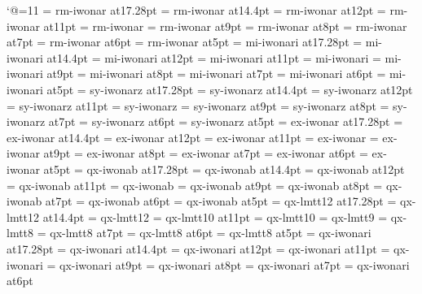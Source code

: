 \catcode`@=11
\font\seventeenrm=  rm-iwonar at17.28pt
\font\fourteenrm=   rm-iwonar at14.4pt
\font\twelverm=     rm-iwonar at12pt
\font\elevenrm=     rm-iwonar at11pt
\font\tenrm=        rm-iwonar
\font\ninerm=       rm-iwonar at9pt
\font\eightrm=      rm-iwonar at8pt
\font\sevenrm=      rm-iwonar at7pt
\font\sixrm=        rm-iwonar at6pt
\font\fiverm=       rm-iwonar at5pt
\font\seventeeni=   mi-iwonari at17.28pt
\font\fourteeni=    mi-iwonari at14.4pt
\font\twelvei=      mi-iwonari at12pt
\font\eleveni=      mi-iwonari at11pt
\font\teni=         mi-iwonari
\font\ninei=        mi-iwonari at9pt
\font\eighti=       mi-iwonari at8pt
\font\seveni=       mi-iwonari at7pt
\font\sixi=         mi-iwonari at6pt
\font\fivei=        mi-iwonari at5pt
\font\seventeensy=  sy-iwonarz at17.28pt
\font\fourteensy=   sy-iwonarz at14.4pt
\font\twelvesy=     sy-iwonarz at12pt
\font\elevensy=     sy-iwonarz at11pt
\font\tensy=        sy-iwonarz
\font\ninesy=       sy-iwonarz at9pt
\font\eightsy=      sy-iwonarz at8pt
\font\sevensy=      sy-iwonarz at7pt
\font\sixsy=        sy-iwonarz at6pt
\font\fivesy=       sy-iwonarz at5pt
\font\seventeenex=  ex-iwonar at17.28pt
\font\fourteenex=   ex-iwonar at14.4pt
\font\twelveex=     ex-iwonar at12pt
\font\elevenex=     ex-iwonar at11pt
\font\tenex=        ex-iwonar
\font\nineex=       ex-iwonar at9pt
\font\eightex=      ex-iwonar at8pt
\font\sevenex=      ex-iwonar at7pt
\font\sixex=        ex-iwonar at6pt
\font\fiveex=       ex-iwonar at5pt
\font\seventeenbf=  qx-iwonab at17.28pt
\font\fourteenbf=   qx-iwonab at14.4pt
\font\twelvebf=     qx-iwonab at12pt
\font\elevenbf=     qx-iwonab at11pt
\font\tenbf=        qx-iwonab
\font\ninebf=       qx-iwonab at9pt
\font\eightbf=      qx-iwonab at8pt
\font\sevenbf=      qx-iwonab at7pt
\font\sixbf=        qx-iwonab at6pt
\font\fivebf=       qx-iwonab at5pt
\font\seventeentt=  qx-lmtt12 at17.28pt
\font\fourteentt=   qx-lmtt12 at14.4pt
\font\twelvett=     qx-lmtt12
\font\eleventt=     qx-lmtt10 at11pt
\font\tentt=        qx-lmtt10
\font\ninett=       qx-lmtt9
\font\eighttt=      qx-lmtt8
\font\seventt=      qx-lmtt8 at7pt
\font\sixtt=        qx-lmtt8 at6pt
\font\fivett=       qx-lmtt8 at5pt
\font\seventeenit=  qx-iwonari at17.28pt
\font\fourteenit=   qx-iwonari at14.4pt
\font\twelveit=     qx-iwonari at12pt
\font\elevenit=     qx-iwonari at11pt
\font\tenit=        qx-iwonari
\font\nineit=       qx-iwonari at9pt
\font\eightit=      qx-iwonari at8pt
\font\sevenit=      qx-iwonari at7pt
\font\sixit=        qx-iwonari at6pt
